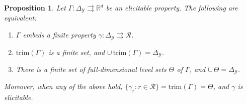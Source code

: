 \documentclass[12pt]{article}
\newcommand{\reals}{\mathbb{R}}
\newcommand{\simplex}{\Delta_\Y}
\newcommand{\R}{\mathcal{R}}
\newcommand{\Y}{\mathcal{Y}}
\newcommand{\toto}{\rightrightarrows}
\newcommand{\trim}{\mathrm{trim}}
\newtheorem{proposition}{Proposition}
\begin{document}
\begin{proposition}\label{prop:embed-trim}
  Let $\Gamma:\simplex\toto\reals^d$ be an elicitable property.
  The following are equivalent:
  \begin{enumerate}\setlength{\itemsep}{0pt}
  \item $\Gamma$ embeds a finite property $\gamma:\simplex \toto \R$.
  \item $\trim(\Gamma)$ is a finite set, and $\cup\,\trim(\Gamma) = \simplex$.
  \item There is a finite set of full-dimensional level sets $\Theta$ of $\Gamma$, and $\cup\,\Theta = \simplex$.
  \end{enumerate}
  Moreover, when any of the above hold, $\{\gamma_r : r\in\R\} = \trim(\Gamma) = \Theta$, and $\gamma$ is elicitable.
\end{proposition}
\end{document}
